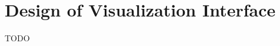\documentclass[journal]{vgtc}                %
\begin{document}
\section{Design of Visualization Interface}

TODO



%

%
%
%


\end{document}
